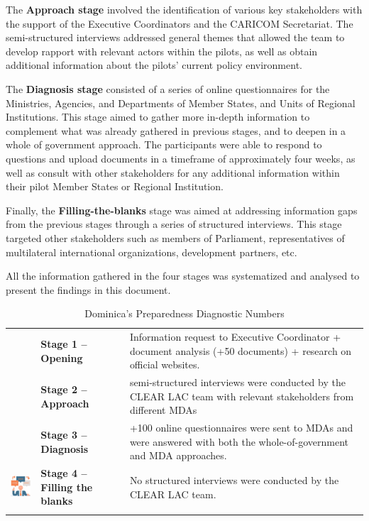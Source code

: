 \documentclass[
]{book}
\begin{document}
The \textbf{Approach stage} involved the identification of various key stakeholders with the support of the Executive Coordinators and the CARICOM Secretariat. The semi-structured interviews addressed general themes that allowed the team to develop rapport with relevant actors within the pilots, as well as obtain additional information about the pilots' current policy environment.

The \textbf{Diagnosis stage} consisted of a series of online questionnaires for the Ministries, Agencies, and Departments of Member States, and Units of Regional Institutions. This stage aimed to gather more in-depth information to complement what was already gathered in previous stages, and to deepen in a whole of government approach. The participants were able to respond to questions and upload documents in a timeframe of approximately four weeks, as well as consult with other stakeholders for any additional information within their pilot Member States or Regional Institution.

Finally, the \textbf{Filling-the-blanks} stage was aimed at addressing information gaps from the previous stages through a series of structured interviews. This stage targeted other stakeholders such as members of Parliament, representatives of multilateral international organizations, development partners, etc.

All the information gathered in the four stages was systematized and analysed to present the findings in this document.

\begin{longtable}[]{@{}
  >{\raggedright\arraybackslash}p{}
  >{\centering\arraybackslash}p{}
  >{\raggedleft\arraybackslash}p{}@{}}
\caption{\label{tab:table1} Dominica's Preparedness Diagnostic Numbers}\tabularnewline
\toprule
\endhead
& \textbf{Stage 1 -- Opening} & Information request to Executive Coordinator + document analysis (+50 documents) + research on official websites. \\
& \textbf{Stage 2 -- Approach} & 7 semi-structured interviews were conducted by the CLEAR LAC team with relevant stakeholders from different MDAs \\
& \textbf{Stage 3 -- Diagnosis} & +100 online questionnaires were sent to MDAs and were answered with both the whole-of-government and MDA approaches. \\
\includegraphics{./images/tb1_4.png} & \textbf{Stage 4 -- Filling the blanks} & No structured interviews were conducted by the CLEAR LAC team. \\
& & \\
\bottomrule
\end{longtable}
\end{document}
